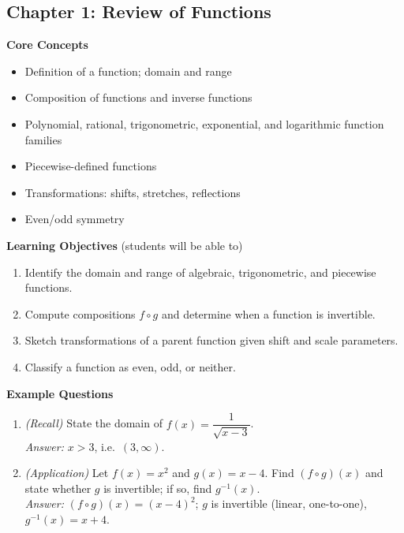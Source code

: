 \documentclass[11pt]{article}
\begin{document}
\subsection{Chapter 1: Review of Functions}
\textbf{Core Concepts}
\begin{itemize}
\item Definition of a function; domain and range
\item Composition of functions and inverse functions
\item Polynomial, rational, trigonometric, exponential, and logarithmic function families
\item Piecewise-defined functions
\item Transformations: shifts, stretches, reflections
\item Even/odd symmetry
\end{itemize}
\textbf{Learning Objectives} (students will be able to)
\begin{enumerate}
\item Identify the domain and range of algebraic, trigonometric, and piecewise functions.
\item Compute compositions $f\circ g$ and determine when a function is invertible.
\item Sketch transformations of a parent function given shift and scale parameters.
\item Classify a function as even, odd, or neither.
\end{enumerate}
\textbf{Example Questions}
\begin{enumerate}
\item \emph{(Recall)} State the domain of $f(x) = \dfrac{1}{\sqrt{x-3}}$. \\
\textit{Answer:} $x > 3$, i.e.\ $(3,\infty)$.
\item \emph{(Application)} Let $f(x)=x^2$ and $g(x) = x - 4$. Find $(f\circ g)(x)$ and state whether $g$ is invertible; if so, find $g^{-1}(x)$. \\
\textit{Answer:} $(f\circ g)(x) = (x-4)^2$; $g$ is invertible (linear, one-to-one), $g^{-1}(x) = x+4$.
\end{enumerate}
\end{document}
